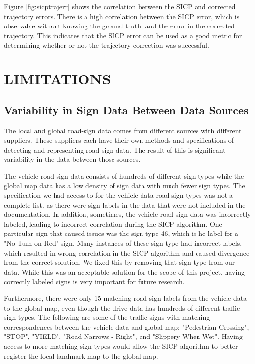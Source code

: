 \documentclass[letterpaper, 10 pt, conference]{ieeeconf}  %
\begin{document}
Figure \ref{fig:sicptrajerr} shows the correlation between the SICP and corrected trajectory errors. There is a high correlation between the SICP error, which is observable without knowing the ground truth, and the error in the corrected trajectory. This indicates that the SICP error can be used as a good metric for determining whether or not the trajectory correction was successful.

\section{LIMITATIONS}


\subsection{Variability in Sign Data Between Data Sources}
The local and global road-sign data comes from different sources with different suppliers. These suppliers each have their own methods and specifications of detecting and representing road-sign data. The result of this is significant variability in the data between those sources.

The vehicle road-sign data consists of hundreds of different sign types while the global map data has a low density of sign data with much fewer sign types. The specification we had access to for the vehicle data road-sign types was not a complete list, as there were sign labels in the data that were not included in the documentation. In addition, sometimes, the vehicle road-sign data was incorrectly labeled, leading to incorrect correlation during the SICP algorithm. One particular sign that caused issues was the sign type 46, which is he label for a "No Turn on Red" sign. Many instances of these sign type had incorrect labels, which resulted in wrong correlation in the SICP algorithm and caused divergence from the correct solution. We fixed this by removing that sign type from our data. While this was an acceptable solution for the scope of this project, having correctly labeled signs is very important for future research.

Furthermore, there were only 15 matching road-sign labels from the vehicle data to the global map, even though the drive data has hundreds of different traffic sign types. The following are some of the traffic signs with matching correspondences between the vehicle data and global map: "Pedestrian Crossing", "STOP", "YIELD", "Road Narrows - Right", and "Slippery When Wet". Having access to more matching sign types would allow the SICP algorithm to better register the local landmark map to the global map.
\end{document}
